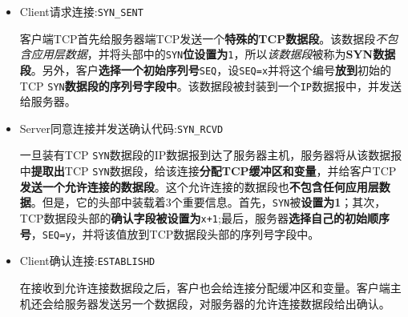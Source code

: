 \documentclass[UTF8,a4paper,8pt]{ctexbook}
\begin{document}
			\begin{itemize}
				\item Client请求连接:\verb|SYN_SENT|
					
					客户端TCP首先给服务器端TCP发送一个\textbf{特殊的TCP数据段}。该数据段\textit{不包含应用层数据}，并将头部中的\verb|SYN|\textbf{位设置为}\verb|1|，所以\textit{该数据段}被称为\textbf{SYN数据段}。另外，客户\textbf{选择一个初始序列号}\verb|SEQ|，设\verb|SEQ=x|并将这个编号\textbf{放到}初始的TCP \verb|SYN|\textbf{数据段的序列号字段中}。该数据段被封装到一个\verb|IP|数据报中，并发送给服务器。
				
				\item Server同意连接并发送确认代码:\verb|SYN_RCVD|
				
					一旦装有TCP \verb|SYN|数据段的IP数据报到达了服务器主机，服务器将从该数据报中\textbf{提取出}TCP \verb|SYN|数据段，给该连接\textbf{分配TCP缓冲区和变量}，并给客户TCP\textbf{发送一个允许连接的数据段}。这个允许连接的数据段也\textbf{不包含任何应用层数据}。但是，它的头部中装载着3个重要信息。首先，\verb|SYN|被\textbf{设置为1}；其次，TCP数据段头部的\textbf{确认字段被设置为}\verb|x+1|;最后，服务器\textbf{选择自己的初始顺序号}，\verb|SEQ=y|，并将该值放到TCP数据段头部的序列号字段中。
					
				\item Client确认连接:\verb|ESTABLISHD|
				
					在接收到允许连接数据段之后，客户也会给连接分配缓冲区和变量。客户端主机还会给服务器发送另一个数据段，对服务器的允许连接数据段给出确认。
					
			\end{itemize}
			
		\newpage
\end{document}
